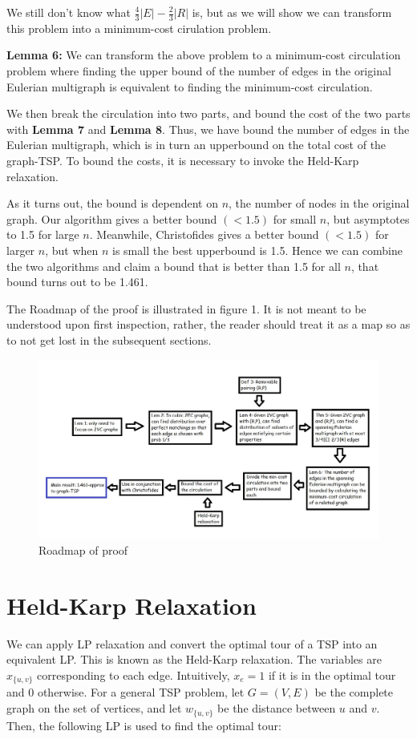 \documentclass[12pt]{article}
\begin{document}
We still don't know what $\frac{4}{3}|E|-\frac{2}{3}|R|$ is, but as we will show we can transform this problem into a minimum-cost cirulation problem.

{\bf Lemma 6:} We can transform the above problem to a minimum-cost circulation problem where finding the upper bound of the number of edges in the original Eulerian multigraph is equivalent to finding the minimum-cost circulation.

We then break the circulation into two parts, and bound the cost of the two parts with {\bf Lemma 7} and {\bf Lemma 8}. Thus, we have bound the number of edges in the Eulerian multigraph, which is in turn an upperbound on the total cost of the graph-TSP. To bound the costs, it is necessary to invoke the Held-Karp relaxation.

As it turns out, the bound is dependent on $n$, the number of nodes in the original graph. Our algorithm gives a better bound $(<1.5)$ for small $n$, but asymptotes to 1.5 for large $n$. Meanwhile, Christofides gives a better bound $(<1.5)$ for larger $n$, but when $n$ is small the best upperbound is 1.5. Hence we can combine the two algorithms and claim a bound that is better than 1.5 for all $n$, that bound turns out to be 1.461.

The Roadmap of the proof is illustrated in figure 1. It is not meant to be understood upon first inspection, rather, the reader should treat it as a map so as to not get lost in the subsequent sections.

\begin{figure}[t]
\includegraphics[width=14cm]{chart.jpg}
\caption{Roadmap of proof}
\end{figure}


\section{Held-Karp Relaxation}
We can apply LP relaxation and convert the optimal tour of a TSP into an equivalent LP. This is known as the Held-Karp relaxation. The variables are $x_{\{u,v\}}$ corresponding to each edge. Intuitively, $x_e=1$ if it is in the optimal tour and $0$ otherwise. For a general TSP problem, let $G=(V,E)$ be the complete graph on the set of vertices, and let $w_{\{u,v\}}$ be the distance between $u$ and $v$. Then, the following LP is used to find the optimal tour:
\end{document}
